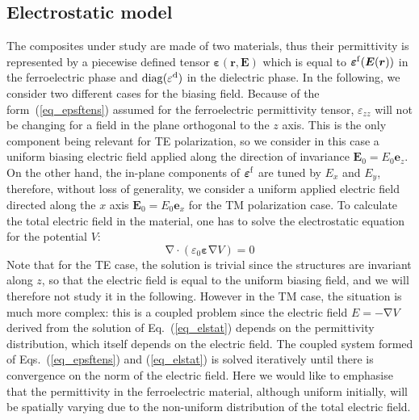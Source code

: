 \documentclass[openacc]{rsproca_new}%
\newcommand{\B}{\boldsymbol}
\newcommand{\tens}[1]{\B{#1}}
\newcommand{\grad}{\B{\mathrm{\nabla}}}
\renewcommand{\div}{\B{\mathrm{\nabla\cdotp}}}
\newcommand{\epsftens}{\tens{\varepsilon}^{\rm f}}
\newcommand{\epstens}{\tens{\varepsilon}}
\newcommand{\epsd}{\varepsilon^{\rm d}}
\newcommand{\epsvac}{\varepsilon_{0}}
\newcommand{\equ}[1]{Eq.~(\ref{#1})}
\begin{document}
\subsection{Electrostatic model}
The composites under study are made of two materials, thus their permittivity
is represented by a piecewise defined tensor $\epstens(\B r, \B E)$ which is
equal to $\epsftens(\B E(\B r))$ in the ferroelectric phase and ${\rm diag}(\epsd)$
in the dielectric phase.
In the following, we consider two different cases for the biasing field.
Because of the form~(\ref{eq_epsftens}) assumed for the ferroelectric permittivity
tensor, $\varepsilon_{zz}$ will not be changing for a field in the plane orthogonal
to the $z$ axis. This is the only component
being relevant for TE polarization, so we consider in this case a uniform biasing
electric field applied along the direction of invariance $\B E_0 = E_{0} \B e_z$.
On the other hand,
the in-plane components of $\epsftens$ are tuned by $E_x$ and $E_y$, therefore,
without loss of generality,
we consider a uniform applied electric field directed along the $x$ axis
$\B E_0 = E_{0} \B e_x$ for the TM polarization case.
To calculate the total electric field in the material, one
has to solve the electrostatic equation for the potential $V$:
\begin{equation}
\div (\epsvac \epstens \grad V) = 0
\label{eq_elstat}
\end{equation}
Note that for the TE case, the solution is trivial since the structures
are invariant along $z$, so that the electric field is equal to the uniform biasing field, and
we will therefore not study it in the following.
However in the TM case, the situation is much more complex: this is a coupled problem since the
electric field $E=-\grad V$ derived from the
solution of \equ{eq_elstat} depends on the permittivity distribution, which
itself depends on the electric field.
The coupled system formed
of Eqs.~(\ref{eq_epsftens}) and (\ref{eq_elstat}) is solved iteratively until there
is convergence on the norm of the electric field.
Here we would like to emphasise that the permittivity in the ferroelectric material, although
uniform initially, will be spatially varying due to the non-uniform distribution
of the total electric field.\\

\end{document}
